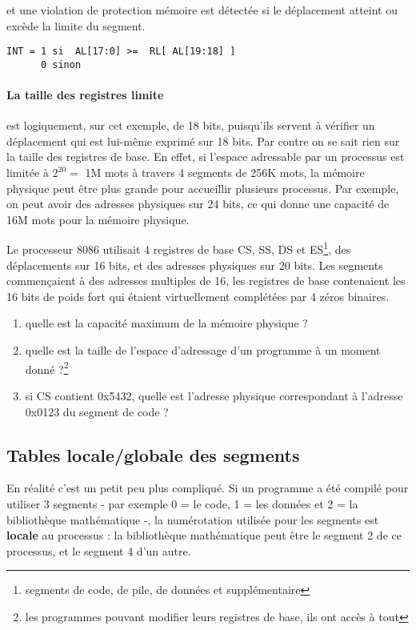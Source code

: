 \begin{multicols}{2}

et une violation de protection mémoire est détectée si le déplacement
atteint ou excède la limite du segment.
\begin{lstlisting}
INT = 1 si  AL[17:0] >=  RL[ AL[19:18] ]
      0 sinon
\end{lstlisting}

\paragraph{La taille des registres limite} est logiquement, 
sur cet exemple,
de 18 bits, puisqu'ils servent à vérifier un déplacement qui est lui-même
exprimé sur 18 bits.  Par contre on se sait rien sur la taille des
registres de base. En effet, si l'espace adressable par un processus
est limitée à $2^{20} = $ 1M mots à travers 4 segments de 256K mots, la
mémoire physique peut être plus grande pour accueillir plusieurs
processus. Par exemple, on peut avoir des adresses physiques sur 24
bits, ce qui donne une capacité de 16M mots pour la mémoire physique.

\begin{exercice}
Le processeur 8086 utilisait 4 registres de base CS, SS, DS et
ES\footnote{segments de code, de pile, de données et supplémentaire},
des déplacements sur 16 bits, et des adresses physiques sur 20
bits. Les segments commençaient à des adresses multiples de 16, les
registres de base contenaient les 16 bits de poids fort qui étaient
virtuellement complétées par 4 zéros binaires.
\begin{enumerate}
\item quelle est la capacité maximum de la mémoire physique ?
\item quelle est la taille de l'espace d'adressage d'un programme à un
  moment donné ?\footnote{les programmes pouvant modifier leurs
    registres de base, ils ont accès à tout}
\item si CS contient 0x5432, quelle est l'adresse physique
  correspondant à l'adresse 0x0123 du segment de code ?
\end{enumerate}
\end{exercice}

\subsection{Tables locale/globale des segments}

En réalité c'est un petit peu plus compliqué. Si un programme a été
compilé pour utiliser 3 segments - par exemple 0 = le code, 
1 = les données 
et 2 = la
bibliothèque mathématique -, la numérotation utilisée pour les segments
est \textbf{locale} au processus : la bibliothèque mathématique peut
être le segment 2 de ce processus, et le segment 4 d'un autre.


\end{multicols}
